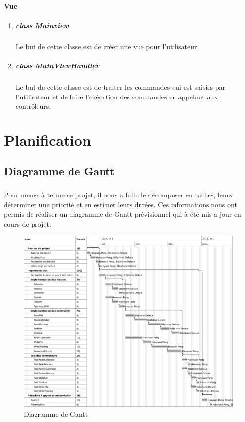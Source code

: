 \documentclass{polytech/polytech}
\begin{document}
	\subsubsection{Vue}
	\begin{enumerate}
		\item \paragraph{class Mainview}
		Le but de cette classe est de créer une vue pour l'utilisateur.

		\item \paragraph{class MainViewHandler}
		Le but de cette classe est de traiter les commandes qui est saisies par l'utilisateur et de faire l'exécution des commandes en appelant aux contrôleurs.
	\end{enumerate}
	\chapter{Planification}

	\section{Diagramme de Gantt}

	\paragraph{}
	Pour mener à terme ce projet, il nous a fallu le décomposer en taches, leurs déterminer une priorité et en estimer leurs durées.
	Ces informations nous ont permis de réaliser un diagramme de Gantt prévisionnel qui à été mis a jour en cours de projet.

	\begin{figure}
		\caption{Diagramme de Gantt}
		\includegraphics[width=13.5cm]{./img/Gantt.png}
	\end{figure}
\end{document}
